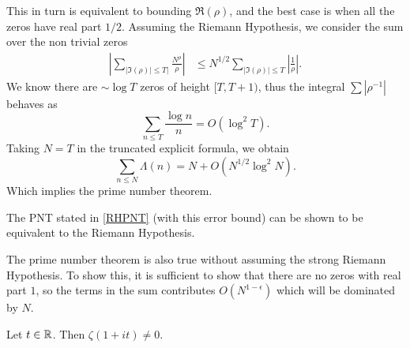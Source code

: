 This in turn is equivalent to bounding $\Re({\rho})$, and the best case is when all the zeros have real part $1/2$.
Assuming the Riemann Hypothesis, we consider the sum over the non trivial zeros \begin{align*}
\left|\sum_{|\Im(\rho)|\leq T|}\frac{N^\rho}{\rho}\right| &\leq N^{1/2} \sum_{|\Im(\rho)|\leq T}\left|{\frac{1}{\rho}}\right|.    
\end{align*}
We know there are $\sim \log T$ zeros of height $[T,T+1)$, thus the integral $\sum |\rho^{-1}|$ behaves as \[
\sum_{n\leq T} \frac{\log n}{n} = O(\log^2 T).
\]
Taking $N=T$ in the truncated explicit formula, we obtain \begin{equation} \label{RHPNT}
    \sum_{n\leq N} \Lambda(n) = N + O(N^{1/2}\log^2 N).
\end{equation}
Which implies the prime number theorem.
\begin{remark}
    The PNT stated in \ref{RHPNT} (with this error bound) can be shown to be equivalent to the Riemann Hypothesis.
\end{remark}
The prime number theorem is also true without assuming the strong Riemann Hypothesis. 
To show this, it is sufficient to show that there are no zeros with real part $1$, so the terms in the sum contributes $O(N^{1-\epsilon})$
which will be dominated by $N$.
\begin{theorem}\label{nozerosatone}
    Let $t\in\mathbb{R}$. Then $\zeta(1+it)\neq 0$.
\end{theorem}
